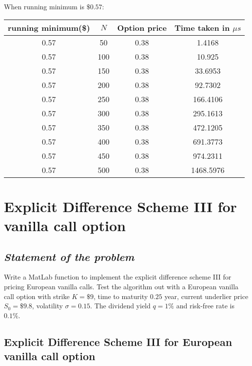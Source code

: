 \hspace{23mm} When running minimum is $\$0.57$: \\
\begin{center}
	\begin{tabular}{| c | c | c | c |}
		\hline running minimum(\$) & $N$ & Option price & Time taken in $\mu s$\\
		[0.5ex]
		\hline 0.57 & 50 & 0.38 & 1.4168 \\
		\hline 0.57 & 100 & 0.38 & 10.925 \\
		\hline 0.57 & 150 & 0.38 & 33.6953 \\
		\hline 0.57 & 200 & 0.38 & 92.7302 \\
		\hline 0.57 & 250 & 0.38 & 166.4106 \\
		\hline 0.57 & 300 & 0.38 & 295.1613 \\
		\hline 0.57 & 350 & 0.38 & 472.1205 \\
		\hline 0.57 & 400 & 0.38 & 691.3773 \\
		\hline 0.57 & 450 & 0.38 & 974.2311 \\
		\hline 0.57 & 500 & 0.38 & 1468.5976 \\
		\hline
	\end{tabular}
\end{center}

\section{Explicit Difference Scheme III for vanilla call option}
\subsection*{\emph{Statement of the problem}}
Write a MatLab function to implement the explicit difference scheme III for pricing European vanilla calls. Test the algorithm out with a European vanilla call option with strike $K = \$9$, time to maturity $0.25$ year, current underlier price $S_0 = \$9.8$, volatility $\sigma=0.15$. The dividend yield $q = 1\%$ and risk-free rate is $0.1\%$.

\subsection{Explicit Difference Scheme III for European vanilla call option}

